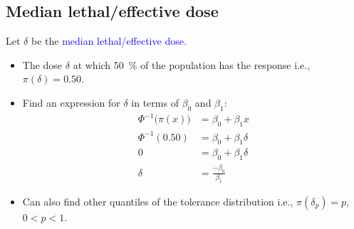 \documentclass[oneside]{book}\usepackage[]{graphicx}\usepackage[svgnames]{xcolor}
\begin{document}
\subsection*{Median lethal/effective dose}
Let $ \delta $ be the \textcolor{Blue}{median lethal/effective dose}.
\begin{itemize}
    \item The dose $ \delta $ at which \qty{50}{\percent} of the population has the response i.e., $ \pi(\delta)=0.50 $.
    \item Find an expression for $ \delta $ in terms of $ \beta_0 $ and $ \beta_1 $:
          \begin{align*}
              \Phi^{-1}\bigl(\pi(x)\bigr) & =\beta_0+\beta_1x         \\
              \Phi^{-1}(0.50)             & =\beta_0+\beta_1\delta    \\
              0                           & =\beta_0+\beta_1\delta    \\
              \delta                      & =\frac{-\beta_0}{\beta_1}
          \end{align*}
    \item Can also find other quantiles of the tolerance distribution i.e., $ \pi(\delta_p)=p $, $ 0<p<1 $.
\end{itemize}
\end{document}
